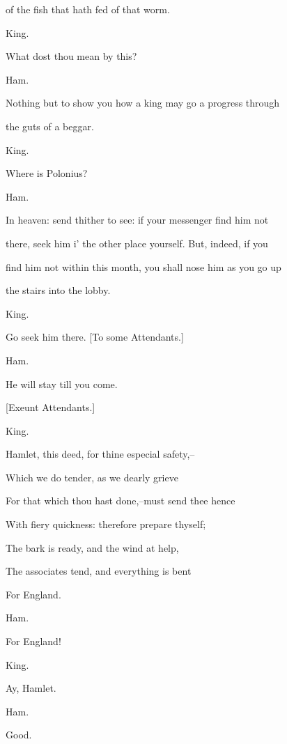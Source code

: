 \documentclass[12pt]{book}
\begin{document}
of the fish that hath fed of that worm.



King.

What dost thou mean by this?



Ham.

Nothing but to show you how a king may go a progress through

the guts of a beggar.



King.

Where is Polonius?



Ham.

In heaven: send thither to see: if your messenger find him not

there, seek him i' the other place yourself. But, indeed, if you

find him not within this month, you shall nose him as you go up

the stairs into the lobby.



King.

Go seek him there. [To some Attendants.]



Ham.

He will stay till you come.



[Exeunt Attendants.]



King.

Hamlet, this deed, for thine especial safety,--

Which we do tender, as we dearly grieve

For that which thou hast done,--must send thee hence

With fiery quickness: therefore prepare thyself;

The bark is ready, and the wind at help,

The associates tend, and everything is bent

For England.



Ham.

For England!



King.

Ay, Hamlet.



Ham.

Good.
\end{document}
